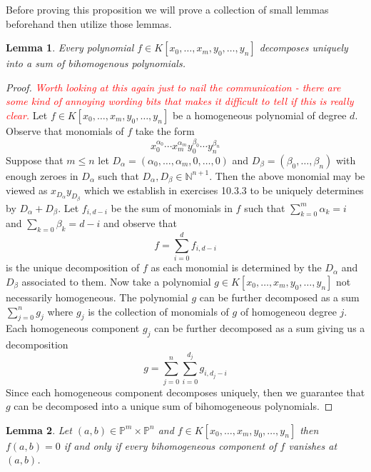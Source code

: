 \documentclass[40pt]{article}
\newcommand{\Proj}{\mathbb{P}}
\newcommand{\N}{\mathbb{N}}
\newcommand{\note}[1]{\textcolor{red}{\emph{#1}}}
\newtheorem{lemma}{Lemma}[section]
\theoremstyle{remark}
\begin{document}
			Before proving this proposition we will prove a collection of small lemmas beforehand then utilize those lemmas.
			\begin{lemma}
				Every polynomial $f \in K[x_0,\dots,x_m,y_0,\dots,y_n]$ decomposes uniquely into a sum of bihomogenous polynomials.
			\end{lemma}
			\begin{proof}\note{Worth looking at this again just to nail the communication - there are some kind of annoying wording bits that makes it difficult to tell if this is really clear.}
				Let $f \in K[x_0,\dots,x_m,y_0,\dots,y_n]$ be a homogeneous polynomial of degree $d$. Observe that monomials of $f$ take the form 
				\[
				x_0^{\alpha_0}\cdots x_m^{\alpha_m}y_0^{\beta_0}\cdots y_n^{\beta_n}
				\]
				Suppose that $m \leq n$ let $D_\alpha = (\alpha_0,\dots,\alpha_m,0,\dots,0)$ and $D_\beta = (\beta_0,\dots,\beta_n)$ with enough zeroes in $D_\alpha$ such that $D_\alpha,D_\beta \in \N^{n+1}$. Then the above monomial may be viewed as $x_{D_\alpha}y_{D_\beta}$ which we establish in exercises 10.3.3 to be uniquely determines by $D_\alpha + D_\beta$. Let $f_{i,d-i}$ be the sum of monomials in $f$ such that $\sum_{k=0}^m\alpha_k = i$ and $\sum_{k=0}\beta_k = d-i$ and observe that 
				\[
				f = \sum_{i = 0}^d f_{i,d-i}
				\]
				is the unique decomposition of $f$ as each monomial is determined by the $D_\alpha$ and $D_\beta$ associated to them. Now take a polynomial $g \in K[x_0,\dots,x_m,y_0,\dots,y_n]$ not necessarily homogeneous. The polynomial $g$ can be further decomposed as a sum $\sum_{j=0}^n g_j$ where $g_j$ is the collection of monomials of $g$ of homogeneou degree $j$. Each homogeneous component $g_j$ can be further decomposed as a sum giving us a decomposition 
				\[
				g = \sum_{j=0}^n \sum_{i=0}^{d_j}g_{i,d_j-i}
				\]
				Since each homogeneous component decomposes uniquely, then we guarantee that $g$ can be decomposed into a unique sum of bihomogeneous polynomials. 
			\end{proof}
			\begin{lemma}
				Let $(a,b) \in \Proj^m \times \Proj^n$ and $f \in K[x_0,\dots,x_m,y_0,\dots,y_n]$ then $f(a,b) = 0$ if and only if  every bihomogeneous component of $f$ vanishes at $(a,b)$.
			\end{lemma}
\end{document}

